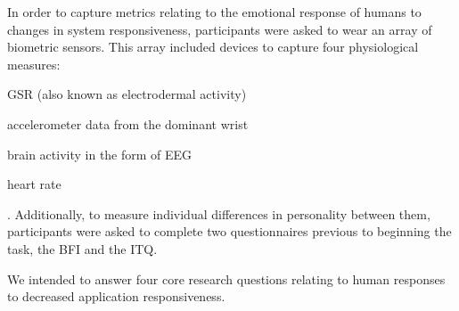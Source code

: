 In order to capture metrics relating to the emotional response of humans to changes in system responsiveness, participants were asked to wear an array of biometric sensors.
This array included devices to capture four physiological measures:
\begin{enumerate*}[itemjoin={{, }}, itemjoin*={{, and }}]
    \item \ac{GSR} (also known as electrodermal activity)
    \item accelerometer data from the dominant wrist
    \item brain activity in the form of \ac{EEG}
    \item heart rate
\end{enumerate*}.
Additionally, to measure individual differences in personality between them, participants were asked to complete two questionnaires previous to beginning the task, the \ac{BFI} and the \ac{ITQ}.





We intended to answer four core research questions relating to human responses to decreased application responsiveness.

